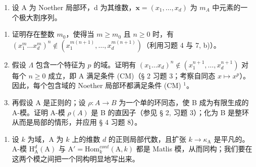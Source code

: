\begin{enumerate}
\def\labelenumi{\arabic{enumi})}
\setcounter{enumi}{8}
\tightlist
\item
  设 A 为 Noether 局部环，d 为其维数，\(\mathbf{x} = (x_{1}, \ldots, x_{d})\) 为 \(m_{A}\) 中元素的一个极大割序列。
\end{enumerate}

\begin{enumerate}
\def\labelenumi{\alph{enumi})}
\item
  证明存在整数 \(m_0\)，使得当 \(m \geqslant m_0\) 且 \(n \geqslant 0\) 时，有 \((x_1^m \ldots x_d^m)^n \not\in (x_1^{m(n+1)}, \ldots, x_d^{m(n+1)})\)（利用习题 4 与 7, b)）。
\item
  假设 \(\Lambda\) 包含一个特征为 \(p\) 的域。证明有 \((x_{1} \ldots x_{d})^{n} \notin (x_{1}^{n+1}, \ldots, x_{d}^{n+1})\) 对每个 \(n \geqslant 0\) 成立，即 A 满足条件 (CM)（§ 2 习题 3；考察自同态 \(x \mapsto x^p\)）。因此，每个包含域的 Noether 局部环都满足条件 (CM) \(^{1}\)。
\item
  再假设 A 是正则的；设 \(\rho: A \to B\) 为一个单的环同态，使 B 成为有限生成的 A-模。证明 A-模 \(\rho(A)\) 是 B 的直因子（参见 § 2, 习题 3）；化为 B 是整环从而是局部的情形，并应用 § 4 习题 8）。
\end{enumerate}

\begin{enumerate}
\def\labelenumi{\arabic{enumi})}
\setcounter{enumi}{9}
\tightlist
\item
  设 \(k\) 为域，A 为 \(k\) 上的维数 \(d\) 的正则局部代数，且扩张 \(k \to \kappa_{\mathrm{A}}\) 是平凡的。A-模 \(\mathrm{H}_{\mathrm{A}}^{d}(\mathrm{A})\) 与 \(\mathrm{A}' = \mathrm{Hom}_k^{cont}(\mathrm{A}, k)\) 都是 Matlis 模，从而同构；我们要在这两个模之间把一个同构明显地写出来。
\end{enumerate}

